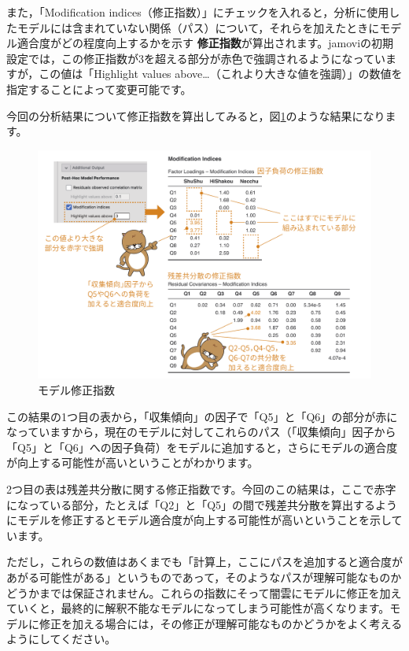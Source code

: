 \documentclass[
  12pt,
  a5jpaper,
  lualatex, ja=standard]{bxjsbook}
\renewcommand{\emph}[1]{\textbf{\color{emph} #1}}
\begin{document}
また，「Modification indices（修正指数）」にチェックを入れると，分析に使用したモデルには含まれていない関係（パス）について，それらを加えたときにモデル適合度がどの程度向上するかを示す\emph{修正指数}が算出されます。jamoviの初期設定では，この修正指数が3を超える部分が赤色で強調されるようになっていますが，この値は「Highlight values above\ldots（これより大きな値を強調）」の数値を指定することによって変更可能です。

今回の分析結果について修正指数を算出してみると，図\ref{fig:factor-cfa-residual-modification-indices}のような結果になります。

\begin{figure}[!ht]

{\centering \includegraphics[width=1\linewidth]{images/factor/cfa-residual-modification-indices} 

}

\caption{モデル修正指数}\label{fig:factor-cfa-residual-modification-indices}
\end{figure}

この結果の1つ目の表から，「収集傾向」の因子で「Q5」と「Q6」の部分が赤になっていますから，現在のモデルに対してこれらのパス（「収集傾向」因子から「Q5」と「Q6」への因子負荷）をモデルに追加すると，さらにモデルの適合度が向上する可能性が高いということがわかります。

2つ目の表は残差共分散に関する修正指数です。今回のこの結果は，ここで赤字になっている部分，たとえば「Q2」と「Q5」の間で残差共分散を算出するようにモデルを修正するとモデル適合度が向上する可能性が高いということを示しています。

ただし，これらの数値はあくまでも「計算上，ここにパスを追加すると適合度があがる可能性がある」というものであって，そのようなパスが理解可能なものかどうかまでは保証されません。これらの指数にそって闇雲にモデルに修正を加えていくと，最終的に解釈不能なモデルになってしまう可能性が高くなります。モデルに修正を加える場合には，その修正が理解可能なものかどうかをよく考えるようにしてください。
\end{document}
